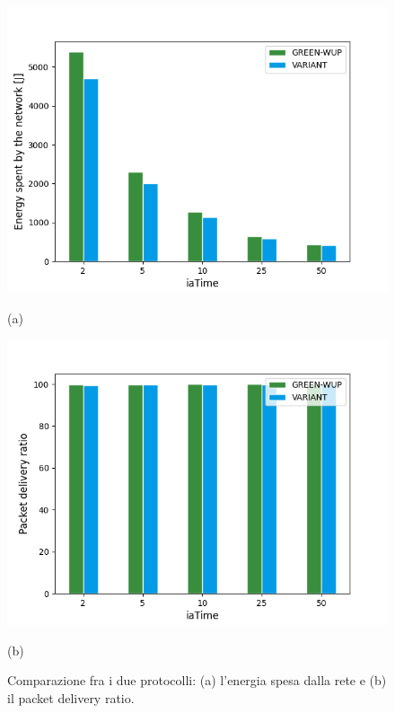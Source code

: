 \documentclass{report}
\begin{document}
\clearpage
\begin{figure}
    \centering
    \begin{minipage}{.5\textwidth}
        \centering
        \includegraphics[width=1\linewidth]{energy_plot.png}
        \caption*{(a)}
    \end{minipage}%
    \begin{minipage}{.5\textwidth}
        \centering
        \includegraphics[width=1\linewidth]{pdr_plot.png}
        \caption*{(b)}
    \end{minipage}
    \caption{Comparazione fra i due protocolli: (a) l'energia spesa dalla rete e (b) il packet delivery ratio.}
\end{figure}
\end{document}
